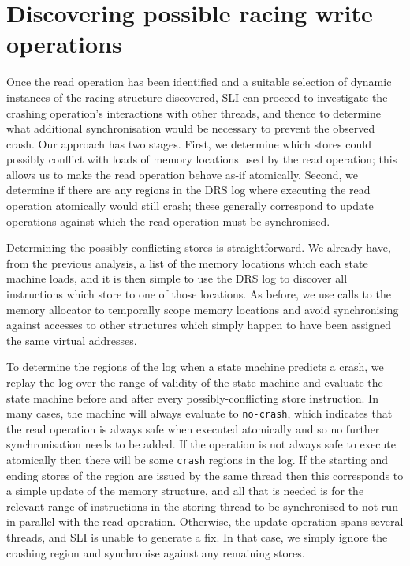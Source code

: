 \documentclass[10pt,letter,twocolumn]{sigplanconf}
\begin{document}
\section{Discovering possible racing write operations}
\label{sect:multi_threading}

Once the read operation has been identified and a suitable selection
of dynamic instances of the racing structure discovered, SLI can
proceed to investigate the crashing operation's interactions with
other threads, and thence to determine what additional synchronisation
would be necessary to prevent the observed crash.  Our approach has
two stages.  First, we determine which stores could possibly conflict
with loads of memory locations used by the read operation; this allows
us to make the read operation behave as-if atomically.  Second, we
determine if there are any regions in the DRS log where executing the
read operation atomically would still crash; these generally
correspond to update operations against which the read operation must
be synchronised.

Determining the possibly-conflicting stores is straightforward.  We
already have, from the previous analysis, a list of the memory
locations which each state machine loads, and it is then simple to use
the DRS log to discover all instructions which store to one of those
locations.  As before, we use calls to the memory allocator to
temporally scope memory locations and avoid synchronising against
accesses to other structures which simply happen to have been assigned
the same virtual addresses.

To determine the regions of the log when a state machine predicts a
crash, we replay the log over the range of validity of the state
machine and evaluate the state machine before and after every
possibly-conflicting store instruction.  In many cases, the machine
will always evaluate to \verb|no-crash|, which indicates that the read
operation is always safe when executed atomically and so no further
synchronisation needs to be added.  If the operation is not always
safe to execute atomically then there will be some \verb|crash|
regions in the log.  If the starting and ending stores of the region
are issued by the same thread then this corresponds to a simple update
of the memory structure, and all that is needed is for the relevant
range of instructions in the storing thread to be synchronised to not
run in parallel with the read operation.  Otherwise, the update
operation spans several threads, and SLI is unable to generate a fix.
In that case, we simply ignore the crashing region and synchronise
against any remaining stores.
\end{document}
